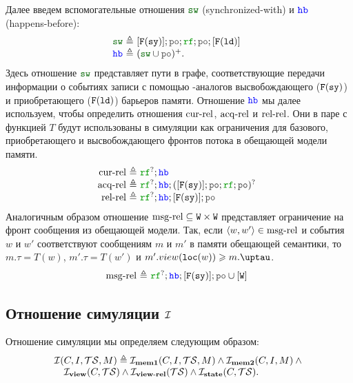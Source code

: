   Далее введем вспомогательные отношения $\lSW$ (synchronized-with) и $\lHB$ (happens-before):
  \[\begin{array}{@{}r@{~}r@{~}l}
  \lSW & \defeq & [\lDMBSY]; \lPO; \lRF; \lPO; [\lDMBLD] \\
  \lHB & \defeq & (\lSW \cup \lPO)^{+}. \\
  \end{array}\]
  Здесь отношение $\lSW$ представляет пути в графе, соответствующие передачи информации о событиях
  записи с помощью \ARM-аналогов высвобождающего (${{\mathtt{F}}}(\mathtt{sy})$) и приобретающего (${{\mathtt{F}}}(\mathtt{ld})$) барьеров
  памяти. Отношение $\lHB$ мы далее используем, чтобы определить
  отношения ${\rm cur\text{-}rel}$, ${\rm acq\text{-}rel}$ и ${\rm rel\text{-}rel}$. Они в паре с функцией $T$ будут использованы в симуляции
  как ограничения для базового, приобретающего и высвобождающего фронтов потока в обещающей модели памяти.
  \[\begin{array}{@{}r@{~}r@{~}l}
  \curRel & \defeq & \lRF^{?}; \lHB \\
  \acqRel & \defeq & \lRF^{?}; \lHB; ([\lDMBSY]; \lPO; \lRF; \lPO)^? \\
  \relRel & \defeq & \lRF^{?}; \lHB; [\lDMBSY]; \lPO \\
  \end{array}\]
  Аналогичным образом отношение ${\rm msg\text{-}rel} \subseteq {\mathtt{W}} \times {\mathtt{W}}$ представляет ограничение на фронт сообщения
  из обещающей модели. Так, если ${\langle{w, w'}\rangle} \in {\rm msg\text{-}rel}$ и события $w$ и $w'$ соответствуют
  сообщениям $m$ и $m'$ в памяти обещающей семантики, то $m.\tau = T(w)$, $m'.\tau = T(w')$ и
  $m'.\view(\lLOC(w)) \ge m.\tau$.
  \[\begin{array}{@{}r@{~}r@{~}l}
  \msgRel & \defeq & \lRF^{?}; \lHB; [\lDMBSY]; \lPO \cup [\lW] \\
  \end{array}\]
  
  \subsection{Отношение симуляции $\mathcal{I}$}
  Отношение симуляции мы определяем следующим образом:
  \[\inarr{
    \simRel(C, \IssuedSet, \TSf, M) \defeq \invMemOne(C, \IssuedSet, \TSf, M) \land  \invMemTwo(C, \IssuedSet, M) \land {} \\
    \quad \invView(C, \TSf) \land \invViewRel(\TSf) \land \invState(C, \TSf).
  }\]

